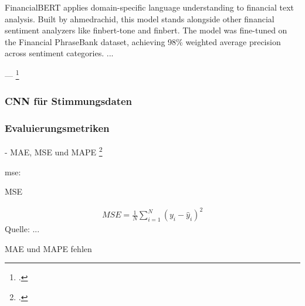 FinancialBERT applies domain-specific language understanding to financial text analysis. Built by ahmedrachid, this model stands alongside other financial sentiment analyzers like finbert-tone and finbert. The model was fine-tuned on the Financial PhraseBank dataset, achieving 98\% weighted average precision across sentiment categories.
...

---
\footcite{hazourli2022financialbert}


\subsubsection{CNN für Stimmungsdaten}\label{sec:theorie_cnn}

\subsubsection{Evaluierungsmetriken}\label{sec:theorie_evalmetrics}

- \ac{MAE}, \ac{MSE} und \ac{MAPE}  
\footcite[Kap. 4.3]{xie2024deep}

mse:

\begin{formel}[h]
	\caption{\ac{MSE}}
	\label{frm:mse}
	\begin{align}
		MSE = \frac{1}{N} \sum_{i=1}^{N} (y_i - \hat{y}_i)^2
	\end{align}
	\vspace{0.5em}
	\normalsize{Quelle: ...}
	\vspace{-1.0em}
\end{formel}

MAE und MAPE fehlen





